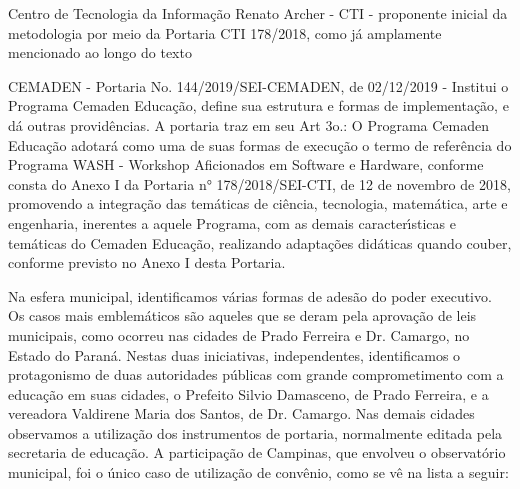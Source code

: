 \documentclass[
12pt,		%
openright,	%
twoside,  %
a4paper,			%
chapter=TITLE,		%
english,			%
french,				%
spanish,			%
brazil				%
]{USPSC-classe/USPSC}
\begin{document}
\begin{alineas}
\item Centro de Tecnologia da Informa\c{c}\~ao Renato Archer - CTI - proponente inicial da metodologia por meio da Portaria CTI 178/2018, como j\'a amplamente mencionado ao longo do texto
\item CEMADEN - Portaria No. 144/2019/SEI-CEMADEN, de 02/12/2019 - Institui o Programa Cemaden Educa\c{c}\~ao, define sua estrutura e formas de implementa\c{c}\~ao, e d\'a outras provid\^encias. A portaria traz em seu Art 3o.: O Programa Cemaden Educa\c{c}\~ao adotar\'a como uma de suas formas de execu\c{c}\~ao o termo de refer\^encia do Programa WASH - Workshop Aficionados em Software e Hardware, conforme consta do Anexo I da Portaria n° 178/2018/SEI-CTI, de 12 de novembro de 2018, promovendo a integra\c{c}\~ao das tem\'aticas de ci\^encia, tecnologia, matem\'atica, arte e engenharia, inerentes a aquele Programa, com as demais caracter\'{\i}sticas e tem\'aticas do Cemaden Educa\c{c}\~ao, realizando adapta\c{c}\~oes did\'aticas quando couber, conforme previsto no Anexo I desta Portaria.
\end{alineas}

Na esfera municipal, identificamos  v\'arias formas de ades\~ao do poder executivo. Os casos mais emblem\'aticos s\~ao aqueles que se deram pela aprova\c{c}\~ao de leis municipais, como ocorreu nas cidades de Prado Ferreira e Dr. Camargo, no Estado do Paran\'a. Nestas duas iniciativas, independentes, identificamos o protagonismo de duas autoridades p\'ublicas com grande comprometimento com a educa\c{c}\~ao em suas cidades, o Prefeito Silvio Damasceno, de Prado Ferreira, e a vereadora Valdirene Maria dos Santos, de Dr. Camargo. Nas demais cidades observamos a utiliza\c{c}\~ao dos instrumentos de portaria, normalmente editada pela secretaria de educa\c{c}\~ao. A participa\c{c}\~ao de Campinas, que envolveu o observat\'orio municipal, foi o \'unico caso de utiliza\c{c}\~ao de conv\^enio, como se v\^e na lista a seguir:
\end{document}
